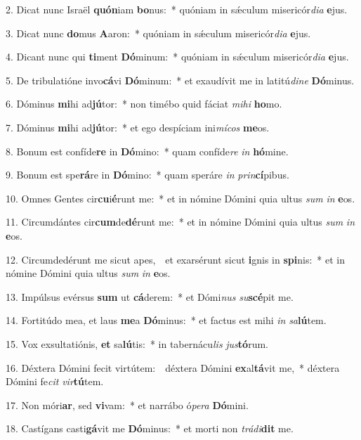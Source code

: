 2. Dicat nunc Israël \textbf{quón}iam \textbf{bo}nus:~* quóniam in s\'{\ae}culum misericór\textit{di}\textit{a} \textbf{e}jus.

3. Dicat nunc \textbf{do}mus \textbf{A}aron:~* quóniam in s\'{\ae}culum misericór\textit{di}\textit{a} \textbf{e}jus.

4. Dicant nunc qui \textbf{ti}ment \textbf{Dó}minum:~* quóniam in s\'{\ae}culum misericór\textit{di}\textit{a} \textbf{e}jus.

5. De tribulatióne invo\textbf{cá}vi \textbf{Dó}minum:~* et exaudívit me in latitú\textit{di}\textit{ne} \textbf{Dó}minus.

6. Dóminus \textbf{mi}hi ad\textbf{jú}tor:~* non timébo quid fáciat \textit{mi}\textit{hi} \textbf{ho}mo.

7. Dóminus \textbf{mi}hi ad\textbf{jú}tor:~* et ego despíciam ini\textit{mí}\textit{cos} \textbf{me}os.

8. Bonum est confíde\textbf{re} in \textbf{Dó}mino:~* quam confíde\textit{re} \textit{in} \textbf{hó}mine.

9. Bonum est spe\textbf{rá}re in \textbf{Dó}mino:~* quam speráre \textit{in} \textit{prin}\textbf{cí}pibus.

10. Omnes Gentes cir\textbf{cu}i\textbf{é}runt me:~* et in nómine Dómini quia ultus \textit{sum} \textit{in} \textbf{e}os.

11. Circumdántes cir\textbf{cum}de\textbf{dé}runt me:~* et in nómine Dómini quia ultus \textit{sum} \textit{in} \textbf{e}os.

12. Circumdedérunt me sicut apes,~\GreDagger\ et exarsérunt sicut \textbf{i}gnis in \textbf{spi}nis:~* et in nómine Dómini quia ultus \textit{sum} \textit{in} \textbf{e}os.

13. Impúlsus evérsus \textbf{sum} ut \textbf{cá}derem:~* et Dómi\textit{nus} \textit{su}\textbf{scé}pit me.

14. Fortitúdo mea, et laus \textbf{me}a \textbf{Dó}minus:~* et factus est mihi \textit{in} \textit{sa}\textbf{lú}tem.

15. Vox exsultatiónis, \textbf{et} sa\textbf{lú}tis:~* in tabernácu\textit{lis} \textit{jus}\textbf{tó}rum.

16. Déxtera Dómini fecit virtútem:~\GreDagger\ déxtera Dómini \textbf{ex}al\textbf{tá}vit me,~* déxtera Dómini fe\textit{cit} \textit{vir}\textbf{tú}tem.

17. Non móri\textbf{ar}, sed \textbf{vi}vam:~* et narrábo ó\textit{pe}\textit{ra} \textbf{Dó}mini.

18. Castígans casti\textbf{gá}vit me \textbf{Dó}minus:~* et morti non \textit{trá}\textit{di}\textbf{dit} me.

